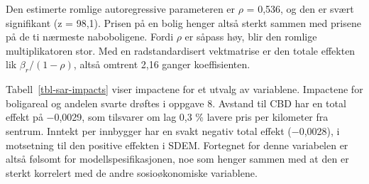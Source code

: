 \documentclass[
  norsk,
  a4paper,
]{article}
\begin{document}
\begin{table}

\caption{\label{tbl-sar-impacts}Impacts fra SAR-modellen (k = 10),
utvalgte variabler. p-verdier i parentes.}


\end{table}%

Den estimerte romlige autoregressive parameteren er \(\rho\) = 0,536, og
den er svært signifikant (z = 98,1). Prisen på en bolig henger altså
sterkt sammen med prisene på de ti nærmeste naboboligene. Fordi \(\rho\)
er såpass høy, blir den romlige multiplikatoren stor. Med en
radstandardisert vektmatrise er den totale effekten lik
\(\beta_r / (1 - \rho)\), altså omtrent 2,16 ganger koeffisienten.

Tabell~\ref{tbl-sar-impacts} viser impactene for et utvalg av
variablene. Impactene for boligareal og andelen svarte drøftes i oppgave
8. Avstand til CBD har en total effekt på −0,0029, som tilsvarer om lag
0,3 \% lavere pris per kilometer fra sentrum. Inntekt per innbygger har
en svakt negativ total effekt (−0,0028), i motsetning til den positive
effekten i SDEM. Fortegnet for denne variabelen er altså følsomt for
modellspesifikasjonen, noe som henger sammen med at den er sterkt
korrelert med de andre sosioøkonomiske variablene.
\end{document}
